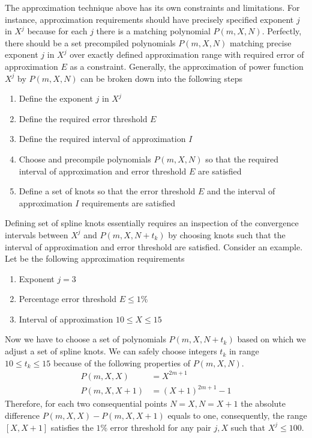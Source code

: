 The approximation technique above has its own constraints and limitations.
For instance, approximation requirements should have precisely specified exponent $j$ in $X^j$ because
for each $j$ there is a matching polynomial $P(m,X,N)$.
Perfectly, there should be a set precompiled polynomials $P(m,X,N)$ matching precise exponent $j$ in $X^j$ over
exactly defined approximation range with required error of approximation $E$ as a constraint.
Generally, the approximation of power function $X^j$ by $P(m,X,N)$ can be broken down into the following steps
\begin{enumerate}
    \item Define the exponent $j$ in $X^j$
    \item Define the required error threshold $E$
    \item Define the required interval of approximation $I$
    \item Choose and precompile polynomials $P(m,X,N)$
    so that the required interval of approximation and error threshold $E$ are satisfied
    \item Define a set of knots so that the error threshold $E$ and the interval of approximation $I$ requirements are satisfied
\end{enumerate}
Defining set of spline knots essentially requires an inspection of the
convergence intervals between $X^j$ and $P(m,X,N+t_k)$
by choosing knots such that the interval of approximation and error threshold are satisfied.
Consider an example.
Let be the following approximation requirements
\begin{enumerate}
    \item Exponent $j=3$
    \item Percentage error threshold $E\leq 1\%$
    \item Interval of approximation $10 \leq X \leq 15$
\end{enumerate}
Now we have to choose a set of polynomials $P(m, X, N+t_k)$ based on which we adjust a set of spline knots.
We can safely choose integers $t_k$ in range $10 \leq t_k \leq 15$ because
of the following properties of $P(m,X, N)$.
\begin{align*}
    P(m,X, X) &= X^{2m+1} \\
    P(m,X, X+1) &= (X+1)^{2m+1} - 1
\end{align*}
Therefore, for each two consequential points $N=X, N=X+1$ the absolute difference $P(m,X, X) - P(m,X, X+1)$ equals to one,
consequently, the range $[X, X+1]$ satisfies the $1\%$ error threshold for any pair $j, X$ such that $X^j \leq 100$.
